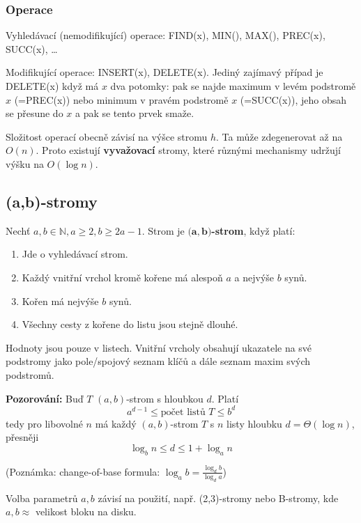 \documentclass[11pt]{report} %
\newcommand{\N}{\mathbb{N}}
\numberwithin{equation}{section}
\begin{document}
\subsubsection{Operace}
Vyhledávací (nemodifikující) operace: FIND(x), MIN(), MAX(), PREC(x), SUCC(x), \dots

Modifikující operace: INSERT(x), DELETE(x). Jediný zajímavý případ je DELETE(x) když má $x$ dva potomky: pak se najde maximum v levém podstromě $x$ (=PREC(x)) nebo minimum v pravém podstromě $x$ (=SUCC(x)), jeho obsah se přesune do $x$ a pak se tento prvek smaže.
	
Složitost operací obecně závisí na výšce stromu $h$. Ta může zdegenerovat až na $O(n)$. Proto existují \textbf{vyvažovací} stromy, které různými mechanismy udržují výšku na $O(\log n)$.


\subsection{(a,b)-stromy}
Nechť $a, b \in \N, a \geq 2, b \geq 2a-1$. Strom je \textbf{$\mathbf{\boldsymbol{(}a, b\boldsymbol{)}}$-strom}, když platí:
\begin{enumerate}
	
	
	\item Jde o vyhledávací strom.
	\item Každý vnitřní vrchol kromě kořene má alespoň $a$ a nejvýše $b$ synů.
	\item Kořen má nejvýše $b$ synů.
	\item Všechny cesty z kořene do listu jsou stejně dlouhé.
\end{enumerate}

Hodnoty jsou pouze v listech. Vnitřní vrcholy obsahují ukazatele na své podstromy jako pole/spojový seznam klíčů a dále seznam maxim svých podstromů.

\noindent\textbf{Pozorování:} Buď $T$ $(a, b)$-strom s hloubkou $d$. Platí 
$$a^{d-1} \leq \text{počet listů } T \leq b^d$$
tedy pro libovolné $n$ má každý $(a, b)$-strom $T$ s $n$ listy hloubku $d = \Theta(\log n)$, přesněji
$$\log_b n \leq d \leq 1 + \log_a n$$

(Poznámka: change-of-base formula: $\log_a b = \frac{\log_d b}{\log_d a}$)

Volba parametrů $a,b$ závisí na použití, např. (2,3)-stromy nebo B-stromy, kde $a,b \approx $ velikost bloku na disku.
\end{document}
